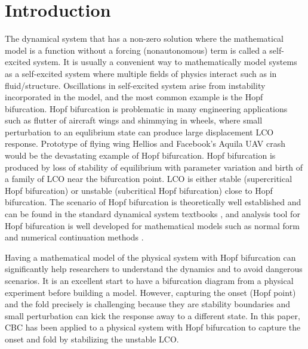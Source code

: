 \documentclass[openacc]{rsproca_new}%
\begin{document}
\maketitle

\section{Introduction}\label{int}

The dynamical system that has a non-zero solution where the mathematical model is a function without a forcing (nonautonomous) term is called a self-excited system. It is usually a convenient way to mathematically model systems as a self-excited system where multiple fields of physics interact such as in fluid/structure. Oscillations in self-excited system arise from instability incorporated in the model, and the most common example is the Hopf bifurcation. Hopf bifurcation is problematic in many engineering applications such as flutter of aircraft wings and shimmying in wheels, where small perturbation to an equlibrium state can produce large displacement LCO response. Prototype of flying wing Hellios \cite{noll2004investigation} and Facebook's Aquila UAV crash would be the devastating example of Hopf bifurcation. Hopf bifurcation is produced by loss of stability of equilibrium with parameter variation and birth of a family of LCO near the bifurcation point. LCO is either stable (supercritical Hopf bifurcation) or unstable (subcritical Hopf bifurcation) close to Hopf bifurcation. The scenario of Hopf bifurcation is theoretically well established and can be found in the standard dynamical system textbooks \cite{kuznetsov2013elements}, and analysis tool for Hopf bifurcation is well developed for mathematical models such as normal form \cite{yu2002simplest,ashwin1995numerical} and numerical continuation methods \cite{doedel2000auto2000,dankowicz2013recipes}.

Having a mathematical model of the physical system with Hopf bifurcation can significantly help researchers to understand the dynamics and to avoid dangerous scenarios.  It is an excellent start to have a bifurcation diagram from a physical experiment before building a model. However, capturing the onset (Hopf point) and the fold precisely is challenging because they are stability boundaries and small perturbation can kick the response away to a different state. In this paper, CBC has been applied to a physical system with Hopf bifurcation to capture the onset and fold by stabilizing the unstable LCO.
\end{document}
